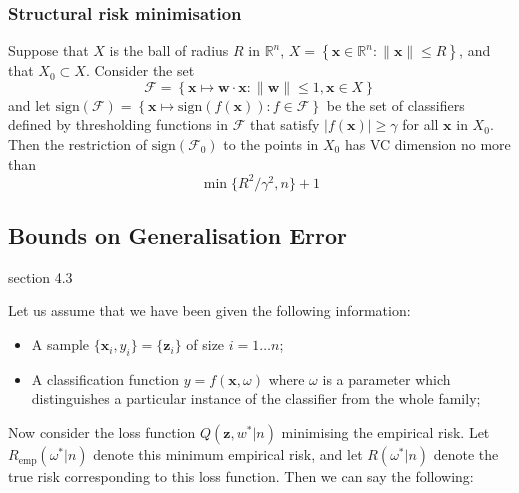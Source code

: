 \subsubsection{Structural risk minimisation}

Suppose that $X$ is the ball of radius $R$ in $\mathbb{R}^n$,
$X = \left\{ \mathbf{x} \in \mathbb{R}^n : \| \mathbf{x} \| \leq R
\right\} $, and that $X_0 \subset X$.  Consider the set
\begin{equation}
\mathcal{F} = \left\{ \mathbf{x} \mapsto \mathbf{w} \cdot \mathbf{x} :
\|\mathbf{w}\| \leq 1, \mathbf{x} \in X \right\}
\end{equation}
and let $\mathrm{sign}(\mathcal{F}) = \left\{ \mathbf{x} \mapsto
\mathrm{sign}(f(\mathbf{x})) : f \in \mathcal{F} \right\}$ be the set of
classifiers defined by thresholding functions in $\mathcal{F}$ that
satisfy $|f(\mathbf{x})| \geq \gamma$ for all $\mathbf{x}$ in $X_0$.
Then the restriction of $\mathrm{sign}(\mathcal{F}_0)$ to the points
in $X_0$ has VC dimension no more than
\begin{equation}
\min \{R^2/\gamma^2, n\} + 1
\end{equation}


\subsection{Bounds on Generalisation Error}
\cite{Cherkassky98} section 4.3

Let us assume that we have been given the following information:

\begin{itemize}

\item	A sample $\{\mathbf{x}_i, y_i\} = \{\mathbf{z}_i\}$ of size
	$i=1 \ldots n$;

\item	A classification function $y = f(\mathbf{x}, \omega)$ where
	$\omega$ is a parameter which distinguishes a particular
	instance of the classifier from the whole family;

\end{itemize}

Now consider the loss function $Q(\mathbf{z}, w^* | n)$ minimising the
empirical risk.  Let $R_{\mathrm{emp}}(\omega^* | n)$ denote this
minimum empirical risk, and let $R(\omega^* | n)$ denote the true risk
corresponding to this loss function.  Then we can say the following:

